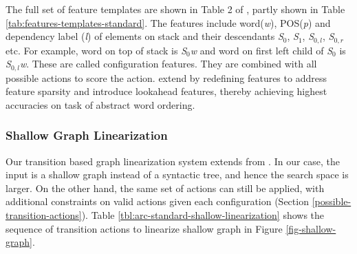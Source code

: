 \documentclass[11pt]{article}
\begin{document}
The full set of feature templates are shown in Table 2 of , partly shown in Table \ref{tab:features-templates-standard}. The features include word({\it w}), POS({\it p}) and dependency label ({\it l}) of elements on stack and their descendants {\it S}$_0$, {\it S}$_1$, {\it S}$_{0,l}$, {\it S}$_{0,r}$ etc. For example, word on top of stack is {\it S}$_0${\it w} and word on first left child of {\it S}$_0$ is {\it S}$_{0,l}${\it w}. These are called configuration features. They are combined with all possible actions to score the action.
 extend  by redefining features to address feature sparsity and introduce lookahead features, thereby achieving highest accuracies on task of abstract word ordering. 

\subsubsection{Shallow Graph Linearization}
Our transition based graph linearization system extends from . In our case, the input is a shallow graph instead of a syntactic tree, and hence the search space is larger. On the other hand, the same set of actions can still be applied, with additional constraints on valid actions given each configuration (Section \ref{possible-transition-actions}). Table \ref{tbl:arc-standard-shallow-linearization} shows the sequence of transition actions to linearize shallow graph in Figure \ref{fig-shallow-graph}. 
\end{document}
